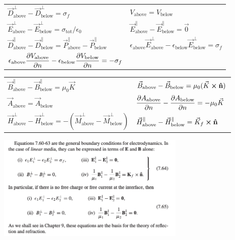 \documentclass{article}
\newcommand{\ds}{\displaystyle}
\newcommand{\formbox}[2]{\begin{center} \begin{tcolorbox}[colback=white, title = #1, boxrule=2pt,arc=3.4pt,boxsep=0mm] #2\end{tcolorbox}\end{center}}
\begin{document}
\begin{multicols*}{2}
    \formbox{Boundary Conditions in Electrostatics}{
        {\renewcommand{\arraystretch}{1.75}%
        \begin{tabular}{ l l }
            $\vec{D}_{\text{above}}^{\perp} - \vec{D}_{\text{below}}^{\perp}  = \sigma_f$&
            $V_\text{above} = V_\text{below}$
            \\
            $\vec{E}_{\text{above}}^{\perp} - \vec{E}_{\text{below}}^{\perp}  = \sigma_{\text{tot}}/\epsilon_0$&
            $\vec{E}_{\text{above}}^{\parallel} - \vec{E}_{\text{below}}^{\parallel}  = \vec{0}$\\
            $\vec{D}_{\text{above}}^{\parallel} - \vec{D}_{\text{below}}^{\parallel} = \vec{P}_{\text{above}}^{\parallel} - \vec{P}_{\text{below}}^{\parallel}$&
            $\epsilon_\text{above}\vec{E}_\text{above}^\perp - \epsilon_\text{below}\vec{E}_\text{below}^\perp = \sigma_f$\\
            $\ds \epsilon_\text{above}\pdv{V_\text{above}}{n} - \epsilon_\text{below}\pdv{V_\text{below}}{n} = -\sigma_f$
        \end{tabular}}
    }
    \formbox{Boundary Conditions in Magnetostatics}{
        {\renewcommand{\arraystretch}{1.75}%
        \begin{tabular}{ l l }
            $\vec{B}_\text{above}^\parallel - \vec{B}_\text{below}^\parallel = \mu_0\vec{K}$ &
            $\vec{B}_\text{above} - \vec{B}_\text{below} = \mu_0(\vec{K}\cross\vu{n})$\\
            $\vec{A}_\text{above} = \vec{A}_\text{below}$&
            $\ds \pdv{A_\text{above}}{n} - \pdv{A_\text{below}}{n} = -\mu_0\vec{K}$\\
            $\vec{H}_\text{above}^\perp - \vec{H}_\text{below}^\perp = - (\vec{M}_\text{above}^\perp - \vec{M}_\text{below}^\perp) $&
            $\vec{H}_\text{above}^\parallel - \vec{H}_\text{below}^\parallel = \vec{K}_f \cross \vu{n}$
        \end{tabular}}
    }
    \formbox{More Boundary Conditions}{
        \begin{center}
            \includegraphics[width=9cm]{boundary-conditions.png}

\end{center}}
\end{multicols*}
\end{document}
